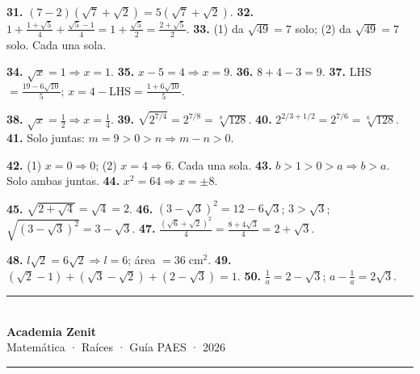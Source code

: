\documentclass[11pt, letterpaper]{article}
\begin{document}
\begin{tcolorbox}[answerbox, title={Desarrollos clave}]
\medskip

\noindent\textbf{31.} $(7-2)(\sqrt7+\sqrt2)=5(\sqrt7+\sqrt2)$. \quad
\textbf{32.} $1+\frac{1+\sqrt5}{4}+\frac{\sqrt5-1}{4}=1+\frac{\sqrt5}{2}=\frac{2+\sqrt5}{2}$. \quad
\textbf{33.} (1) da $\sqrt{49}=7$ solo; (2) da $\sqrt{49}=7$ solo. Cada una sola.

\medskip

\noindent\textbf{34.} $\sqrt x=1\Rightarrow x=1$. \quad
\textbf{35.} $x-5=4\Rightarrow x=9$. \quad
\textbf{36.} $8+4-3=9$. \quad
\textbf{37.} LHS$=\frac{19-6\sqrt{10}}{5}$; $x=4-\text{LHS}=\frac{1+6\sqrt{10}}{5}$.

\medskip

\noindent\textbf{38.} $\sqrt x=\tfrac12\Rightarrow x=\tfrac14$. \quad
\textbf{39.} $\sqrt{2^{7/4}}=2^{7/8}=\sqrt[8]{128}$. \quad
\textbf{40.} $2^{2/3+1/2}=2^{7/6}=\sqrt[6]{128}$. \quad
\textbf{41.} Solo juntas: $m=9>0>n\Rightarrow m-n>0$.

\medskip

\noindent\textbf{42.} (1) $x=0\Rightarrow0$; (2) $x=4\Rightarrow6$. Cada una sola. \quad
\textbf{43.} $b>1>0>a\Rightarrow b>a$. Solo ambas juntas. \quad
\textbf{44.} $x^2=64\Rightarrow x=\pm8$.

\medskip

\noindent\textbf{45.} $\sqrt{2+\sqrt{4}}=\sqrt4=2$. \quad
\textbf{46.} $(3-\sqrt3)^2=12-6\sqrt3$; $3>\sqrt3$; $\sqrt{(3-\sqrt3)^2}=3-\sqrt3$. \quad
\textbf{47.} $\frac{(\sqrt6+\sqrt2)^2}{4}=\frac{8+4\sqrt3}{4}=2+\sqrt3$.

\medskip

\noindent\textbf{48.} $l\sqrt2=6\sqrt2\Rightarrow l=6$; área $=36\;\text{cm}^2$. \quad
\textbf{49.} $(\sqrt2-1)+(\sqrt3-\sqrt2)+(2-\sqrt3)=1$. \quad
\textbf{50.} $\frac{1}{a}=2-\sqrt3$; $a-\frac{1}{a}=2\sqrt3$.
\end{tcolorbox}

\vspace{0.4cm}
\begin{center}
\textcolor{zenitnavy}{\rule{0.6\linewidth}{0.8pt}}\\[0.4cm]
{\large\bfseries\color{zenitnavy} Academia Zenit}\\[3pt]
{\color{zenitgold} Matemática · Raíces · Guía PAES · 2026}\\[4pt]
\textcolor{zenitnavy}{\rule{0.6\linewidth}{0.8pt}}
\end{center}
\end{document}
